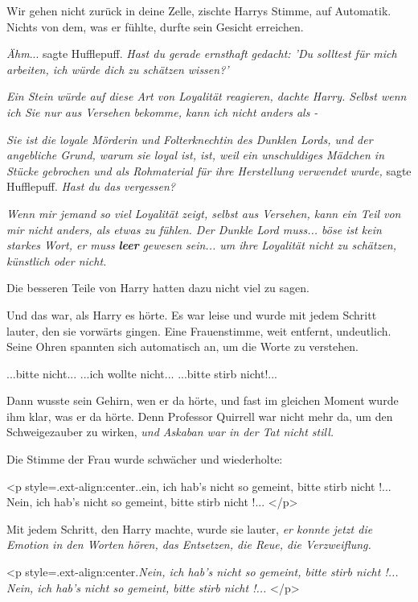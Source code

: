 \glqq Wir gehen nicht zurück in deine Zelle\grqq{}, zischte Harrys Stimme, auf
Automatik. Nichts von dem, was er fühlte, durfte sein Gesicht erreichen.

\emph{Ähm}... sagte Hufflepuff. \emph{Hast du gerade ernsthaft gedacht: 'Du
solltest für mich arbeiten, ich würde dich zu schätzen wissen?' }

\emph{Ein Stein würde auf diese Art von Loyalität reagieren, dachte Harry. Selbst wenn ich Sie nur aus Versehen bekomme, kann ich nicht anders als - }

\emph{Sie ist die loyale Mörderin und Folterknechtin des Dunklen Lords, und der
angebliche Grund, warum sie loyal ist, ist, weil ein unschuldiges Mädchen in
Stücke gebrochen und als Rohmaterial für ihre Herstellung verwendet wurde,
}sagte Hufflepuff. \emph{Hast du das vergessen? }

\emph{Wenn mir jemand so viel Loyalität zeigt, selbst aus Versehen, kann ein
Teil von mir nicht anders, als etwas zu fühlen. Der Dunkle Lord muss... böse ist
kein starkes Wort, er muss }\textbf{\emph{leer}}\emph{ gewesen sein... um ihre
Loyalität nicht zu schätzen, künstlich oder nicht.}

Die besseren Teile von Harry hatten dazu nicht viel zu sagen.

Und das war, als Harry es hörte. Es war leise und wurde mit jedem Schritt
lauter, den sie vorwärts gingen. Eine Frauenstimme, weit entfernt, undeutlich.
Seine Ohren spannten sich automatisch an, um die Worte zu verstehen.

\glqq ...bitte nicht...\grqq{} \glqq ...ich wollte nicht...\grqq{} \glqq
...bitte stirb nicht!...\grqq{}

Dann wusste sein Gehirn, wen er da hörte, und fast im gleichen Moment wurde ihm
klar, was er da hörte. Denn Professor Quirrell war nicht mehr da, um den
Schweigezauber zu wirken, \emph{und Askaban war in der Tat nicht still.}

Die Stimme der Frau wurde schwächer und wiederholte:

<p style=\grqq{}.ext-align:center\grqq{}.\grqq{}.ein, ich hab's nicht so
gemeint, bitte stirb nicht !...\grqq{} \glqq Nein, ich hab's nicht so gemeint,
bitte stirb nicht !...\grqq{} </p>

Mit jedem Schritt, den Harry machte, wurde sie lauter, \emph{er konnte jetzt die
Emotion in den Worten hören, das Entsetzen, die Reue, die Verzweiflung.}

<p style=\grqq{}.ext-align:center\grqq{}.\emph{\glqq Nein, ich hab's nicht so
gemeint, bitte stirb nicht !...\grqq{} \glqq Nein, ich hab's nicht so gemeint,
bitte stirb nicht !...\grqq{} }</p>


